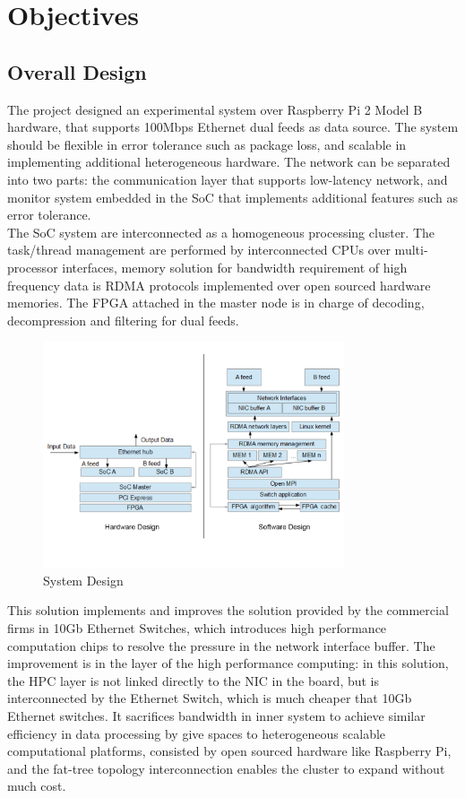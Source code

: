 \documentclass[11pt,openright,a4paper]{report}
\begin{document}
\section{Objectives}
\subsection{Overall Design}
The project designed an experimental system over Raspberry Pi 2 Model B hardware, that supports 100Mbps Ethernet dual feeds as data source. The system should be flexible in error tolerance such as package loss, and scalable in implementing additional heterogeneous hardware. The network can be separated into two parts: the communication layer that supports low-latency network, and monitor system embedded in the SoC that implements additional features such as error tolerance. \\ 
The SoC system are interconnected as a homogeneous processing cluster. The task/thread management are performed by interconnected CPUs over multi-processor interfaces, memory solution for bandwidth requirement of high frequency data is RDMA protocols implemented over open sourced hardware memories. The FPGA attached in the master node is in charge of decoding, decompression and filtering for dual feeds.\\
\begin{figure}[htbp]
	\centering\includegraphics[width=3.5in]{picture/System_Design.jpg}
	\caption{System Design}
	\label{fig:system_design}
\end{figure}
This solution implements and improves the solution provided by the commercial firms in 10Gb Ethernet Switches, which introduces high performance computation chips to resolve the pressure in the network interface buffer. The improvement is in the layer of the high performance computing: in this solution, the HPC layer is not linked directly to the NIC in the board, but is interconnected by the Ethernet Switch, which is much cheaper that 10Gb Ethernet switches. It sacrifices bandwidth in inner system to achieve similar efficiency in data processing by give spaces to heterogeneous scalable computational platforms, consisted by open sourced hardware like Raspberry Pi, and the fat-tree topology interconnection enables the cluster to expand without much cost.\\
\end{document}

